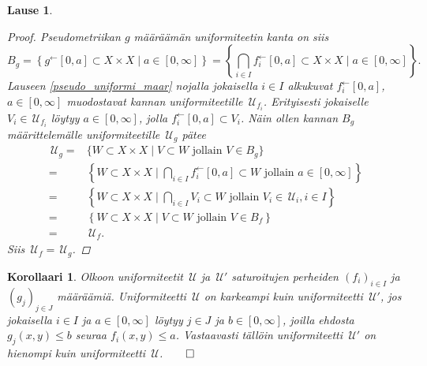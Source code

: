 \documentclass[12pt,a4paper,leqno]{report}
\newcommand{\U}{\,\mathcal{U}}
\theoremstyle{plain}
\newtheorem{lause}[equation]{Lause}
\newtheorem{kor}[equation]{Korollaari}
\theoremstyle{definition}
\theoremstyle{remark}
\begin{document}
\begin{lause}
\begin{proof}
%
Pseudometriikan $g
$
määräämän uniformiteetin kanta on siis
$$B_g=\left\{g^\leftarrow[0,a]\subset X\times X\mid a\in[0,\infty]\right\}
=\left\{\bigcap_{i\in I} f_i^\leftarrow[0,a]\subset X\times X\mid a\in[0,\infty]\right\}.$$
Lauseen \ref{pseudo_uniformi_maar} nojalla jokaisella $i\in I$ 
alkukuvat $f_i^\leftarrow[0,a]$, $a\in[0,\infty]$ 
muodostavat kannan uniformiteetille $\U_{f_i}$. 
Erityisesti jokaiselle $V_i\in\U_{f_i}$ löytyy $a\in [0,\infty]$, 
jolla $ f_i^\leftarrow[0,a]\subset V_i$.
Näin ollen kannan $B_g$ määrittelemälle uniformiteetille $\U_g$ pätee 
\begin{equation*}
\begin{split}
\U_g=&\{W\subset X\times X\mid V\subset W\text{ jollain }V\in B_g\}\\
=&\left\{W\subset X\times X\mid \bigcap_{i\in I} f_i^\leftarrow[0,a]\subset W\text{ jollain }a\in[0,\infty]\right\}\\
=&\left\{W\subset X\times X\mid \bigcap_{i\in I} V_i\subset W\text{ jollain }V_i\in \U_i,i\in I\right\}\\
=&\left\{W\subset X\times X\mid V\subset W\text{ jollain }V\in B_f\right\}\\
=&\U_f.
\end{split}
\end{equation*}
Siis $\U_{f}= \U_{g}$. 
\end{proof}
\end{lause}
\begin{kor}
Olkoon uniformiteetit $\U$ ja $\U'$ saturoitujen perheiden 
$(f_i)_{i\in I}$ ja $(g_j)_{j\in J}$ määräämiä. 
Uniformiteetti $\U$ on karkeampi kuin uniformiteetti $\U'$, 
jos jokaisella $i\in I$ ja $a\in[0,\infty]$ löytyy $j\in J$ ja $b\in[0,\infty]$, 
joilla ehdosta $g_j(x,y)\leq b$ seuraa $f_i(x,y)\leq a$. 
Vastaavasti tällöin uniformiteetti $\U'$ on hienompi kuin uniformiteetti $\U$.$\qed$
\end{kor}
\end{document}
